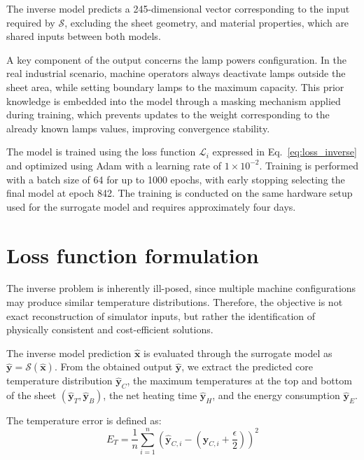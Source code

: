 The inverse model predicts a 245-dimensional vector corresponding to the input required by $\mathcal{S}$, excluding the sheet geometry, and material properties, which are shared inputs between both models.

A key component of the output concerns the lamp powers configuration. In the real industrial scenario, machine operators always deactivate lamps outside the sheet area, while setting boundary lamps to the maximum capacity. This prior knowledge is embedded into the model through a masking mechanism applied during training, which prevents updates to the weight corresponding to the already known lamps values, improving convergence stability.

The model is trained using the loss function $\mathcal{L}_i$ expressed in Eq.~\ref{eq:loss_inverse} and optimized using Adam with a learning rate of $1 \times 10^{-2}$. Training is performed with a batch size of 64 for up to 1000 epochs, with early stopping selecting the final model at epoch 842. The training is conducted on the same hardware setup used for the surrogate model and requires approximately four days.

\section{Loss function formulation}
\label{sec:inverse_loss_function}

The inverse problem is inherently ill-posed, since multiple machine configurations may produce similar temperature distributions. Therefore, the objective is not exact reconstruction of simulator inputs, but rather the identification of physically consistent and cost-efficient solutions.

The inverse model prediction $\mathbf{\hat{x}}$ is evaluated through the surrogate model as $\mathbf{\hat{y}} = \mathcal{S}(\mathbf{\hat{x}})$. From the obtained output $\mathbf{\hat{y}}$, we extract the predicted core temperature distribution $\mathbf{\hat{y}}_C$, the maximum temperatures at the top and bottom of the sheet $(\mathbf{\hat{y}}_T, \mathbf{\hat{y}}_B)$, the net heating time $\mathbf{\hat{y}}_H$, and the energy consumption $\mathbf{\hat{y}}_E$.

The temperature error is defined as:
\begin{equation}
	E_T = \frac{1}{n} \sum_{i=1}^{n} \left( \mathbf{\hat{y}}_{C,i} - \left(\mathbf{y}_{C,i} + \frac{\epsilon}{2}\right) \right)^2
\end{equation}

